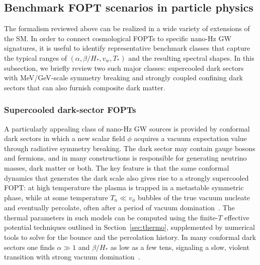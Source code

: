 \documentclass[a4paper,11pt]{article}
\begin{document}
\subsection{Benchmark FOPT scenarios in particle physics}
\label{sec:benchmarks}

The formalism reviewed above can be realized in a wide variety of extensions of the SM. In order 
to connect cosmological FOPTs to specific nano-Hz GW signatures, it is useful to identify representative 
benchmark classes that capture the typical ranges of $(\alpha,\beta/H_*,v_w,T_*)$ and the resulting spectral 
shapes. In this subsection, we briefly review two such major classes: supercooled dark sectors with MeV/GeV-scale 
symmetry breaking and strongly coupled confining dark sectors that can also furnish composite dark matter.

\subsubsection{Supercooled dark-sector FOPTs}
\label{sec:conformal-dark}

A particularly appealing class of nano-Hz GW sources is provided by conformal dark sectors in which a new scalar field 
$\phi$ acquires a vacuum expectation value through radiative symmetry breaking. The dark sector may contain gauge bosons 
and fermions, and in many constructions is responsible for generating neutrino masses, dark matter or both. The key feature 
is that the same conformal dynamics that generates the dark scale also gives rise to a strongly supercooled FOPT: at high
temperature the plasma is trapped in a metastable symmetric phase, while at some temperature $T_n \ll v_\phi$ bubbles 
of the true vacuum nucleate and eventually percolate, often after a period of vacuum domination~\citep{Ellis:2019oqb,Ellis:2020awk,Athron:2022mmm,Athron:2023uxb}. The thermal parameters in such models can be 
computed using the finite-$T$ effective potential techniques outlined in Section~\ref{sec:thermo}, supplemented by 
numerical tools to solve for the bounce and the percolation history. In many conformal dark sectors one finds 
$\alpha \gg 1$ and $\beta/H_*$ as low as a few tens, signaling a slow, violent transition with strong vacuum domination~\citep{Prokopec:2018tnq,Ellis:2019oqb,Ellis:2020nnr}.
\end{document}
